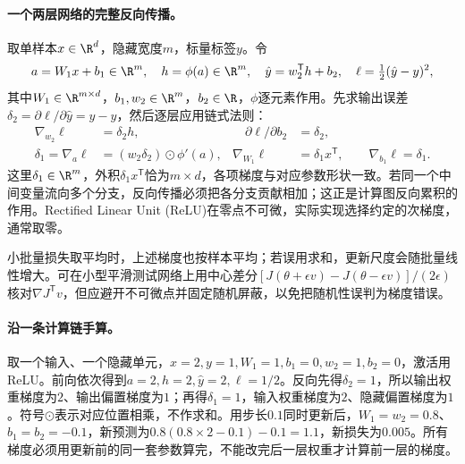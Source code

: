 \paragraph{一个两层网络的完整反向传播。}
取单样本$x\in\R^d$，隐藏宽度$m$，标量标签$y$。令
\begin{equation}
 a=W_1x+b_1\in\R^m,\quad h=\phi(a)\in\R^m,\quad
 \hat y=w_2^{\mathsf T}h+b_2,\quad \ell=\tfrac12(\hat y-y)^2,
\end{equation}
其中$W_1\in\R^{m\times d}$，$b_1,w_2\in\R^m$，$b_2\in\R$，$\phi$逐元素作用。先求输出误差$\delta_2=\partial\ell/\partial\hat y=\hat y-y$，然后逐层应用链式法则：
\begin{align}
 \nabla_{w_2}\ell&=\delta_2h,&\quad \partial\ell/\partial b_2&=\delta_2,\\
 \delta_1=\nabla_a\ell&=(w_2\delta_2)\odot\phi'(a),&
 \nabla_{W_1}\ell&=\delta_1x^{\mathsf T},\qquad \nabla_{b_1}\ell=\delta_1.
\end{align}
这里$\delta_1\in\R^m$，外积$\delta_1x^{\mathsf T}$恰为$m\times d$，各项梯度与对应参数形状一致。若同一个中间变量流向多个分支，反向传播必须把各分支贡献相加；这正是计算图反向累积的作用。Rectified Linear Unit (ReLU)在零点不可微，实际实现选择约定的次梯度，通常取零。

小批量损失取平均时，上述梯度也按样本平均；若误用求和，更新尺度会随批量线性增大。可在小型平滑测试网络上用中心差分$[J(\theta+\epsilon v)-J(\theta-\epsilon v)]/(2\epsilon)$核对$\nabla J^{\mathsf T}v$，但应避开不可微点并固定随机屏蔽，以免把随机性误判为梯度错误。

\paragraph{沿一条计算链手算。}
取一个输入、一个隐藏单元，$x=2,y=1,W_1=1,b_1=0,w_2=1,b_2=0$，激活用ReLU。前向依次得到$a=2,h=2,\hat y=2,\ell=1/2$。反向先得$\delta_2=1$，所以输出权重梯度为$2$、输出偏置梯度为$1$；再得$\delta_1=1$，输入权重梯度为$2$、隐藏偏置梯度为$1$。符号$\odot$表示对应位置相乘，不作求和。用步长$0.1$同时更新后，$W_1=w_2=0.8$、$b_1=b_2=-0.1$，新预测为$0.8(0.8\times2-0.1)-0.1=1.1$，新损失为$0.005$。所有梯度必须用更新前的同一套参数算完，不能改完后一层权重才计算前一层的梯度。

